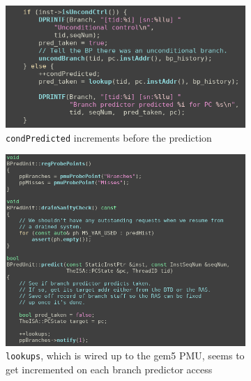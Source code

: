     \begin{figure}[H]
        \centering
        \begin{subfigure}{0.55\linewidth}
            \centering
            \includegraphics[width=\textwidth]{screenshots/br-pred/br-pred-pmu-0x12-condPredicted-src.png}
            \caption{\texttt{condPredicted} increments before the prediction}
            \label{subfig:bp-condpredicted-wrong}
        \end{subfigure}
        \begin{subfigure}{0.55\linewidth}
            \centering
            \includegraphics[width=\linewidth]{screenshots/br-pred/br-pred-pmu-0x12-maybe.png}
            \caption{\texttt{lookups}, which is wired up to the gem5 PMU, seems
                     to get incremented on each branch predictor access}
            \label{subfig:bp-lookups-wrong}
        \end{subfigure}
        \begin{subfigure}{0.55\linewidth}

\end{subfigure}
\end{figure}
